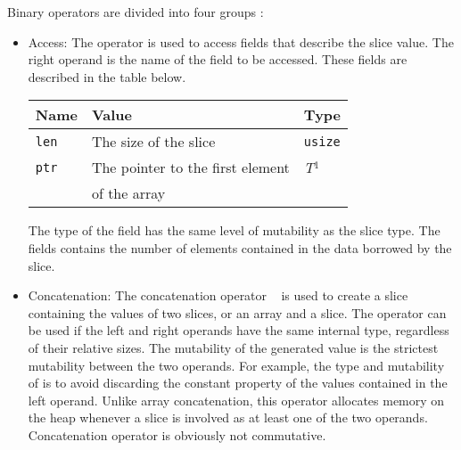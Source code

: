 Binary operators are divided into four groups :
\begin{itemize}
\item Access: The operator  is used to access fields that describe the slice value. The right operand is the name of the field to be accessed. These fields are described in the table below.

  \begin{center}\begin{adjustbox}{max width=\linewidth}
      \begin{threeparttable}
        \begin{tabular}{|l|ll|}
          \hline
          Name & Value & Type\\
          \hline
          \hline
          \texttt{len} & The size of the slice & \texttt{usize} \\
          \texttt{ptr} & The pointer to the first element  & \textit{T}$^{1^{\phantom{j}}}$ \\
          & of the array & \\
          \hline
        \end{tabular}
      \end{threeparttable}
  \end{adjustbox}\end{center}

  The type of the  field has the same level of mutability as the
  slice type. The  fields contains the number of elements contained
  in the data borrowed by the slice.

\item Concatenation: The concatenation operator ~\token{\~} is used to create a
  slice containing the values of two slices, or an array and a slice. The
  operator can be used if the left and right operands have the same internal
  type, regardless of their relative sizes. The mutability of the generated
  value is the strictest mutability between the two operands. For example, the
  type and mutability of  is \token{[*i32]}
  to avoid discarding the constant property of the values contained in the left
  operand. Unlike array concatenation, this operator allocates memory on the
  heap whenever a slice is involved as at least one of the two operands.
  Concatenation operator is obviously not commutative.


\end{itemize}

